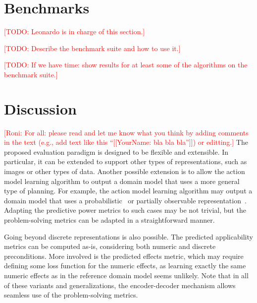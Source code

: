 \documentclass{article}
\theoremstyle{definition}
\theoremstyle{remark}
\newcommand{\todo}[1]{{\textcolor{red}{[TODO: #1]}}}
\newcommand{\roni}[1]{{\textcolor{red}{[Roni: #1]}}}
\begin{document}


\section{Benchmarks}

\todo{Leonardo is in charge of this section.}

\todo{Describe the benchmark suite and how to use it.}

\todo{If we have time: show results for at least some of the algorithms on the benchmark suite.}

\section{Discussion}
\roni{For all: please read and let me know what you think by adding comments in the text (e.g., add text like this ``[[YourName: bla bla bla'']]) or editting.}
The proposed evaluation paradigm is designed to be flexible and extensible. 
In particular, it can be extended to support other types of representations, such as images or other types of data. 
Another possible extension is to allow the action model learning algorithm to output a domain model that uses a more general type of planning. 
For example, the action model learning algorithm may output a domain model that uses a probabilistic~\cite{xi2024neuro} or partially observable representation~\cite{le2024learning}. 
Adapting the predictive power metrics to such cases may be not trivial, but the problem-solving metrics can be adapted in a straightforward manner.


Going beyond discrete representations is also possible. 
The predicted applicability metrics can be computed as-is, considering both numeric and discrete preconditions.
More involved is the predicted effects metric, which may require defining some loss function for the numeric effects, as learning exactly the same numeric effects as in the reference domain model seems unlikely. 
Note that in all of these variants and generalizations, the encoder-decoder mechanism allows seamless use of the problem-solving metrics. 
\end{document}
